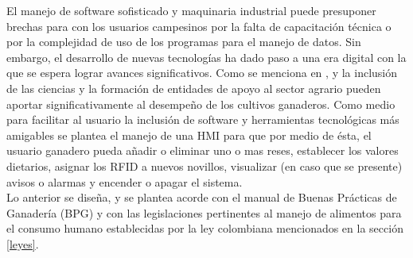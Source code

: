 El manejo de software sofisticado y maquinaria industrial puede presuponer brechas para con los usuarios campesinos por la falta de capacitación técnica o por la complejidad de uso de los programas para el manejo de datos. Sin embargo, el desarrollo de nuevas tecnologías ha dado paso a una era digital con la que se espera lograr avances significativos. Como se menciona en \cite{minagricultura}, \cite{ashby} y \cite{fao} la inclusión de las ciencias y la formación de entidades de apoyo al sector agrario pueden aportar significativamente al desempeño de los  cultivos ganaderos. 
Como medio para facilitar al usuario la inclusión de software y herramientas tecnológicas más amigables se plantea el manejo de una HMI para que por medio de ésta, el usuario ganadero pueda añadir o eliminar uno o mas reses, establecer los valores dietarios, asignar los RFID a nuevos novillos, visualizar (en caso que se presente) avisos o alarmas y encender o apagar el sistema.\\

Lo anterior se diseña, y se plantea acorde con el manual de Buenas Prácticas de Ganadería  (BPG) y con las legislaciones pertinentes al manejo de alimentos para el consumo humano establecidas por la ley colombiana mencionados en la sección \ref{leyes}.
















